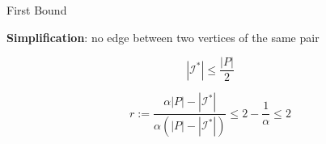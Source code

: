 \begin{frame}{First Bound}

\textbf{Simplification}: no edge between two vertices of the same pair


\pause
\begin{observation}
$$ |\mathcal{I}^*| \leq \frac{|P|}{2} $$
\end{observation}

\pause
\begin{corollary}
$$
r 													:= 
\frac{\alpha |P| - |\mathcal{I}^*|}{\alpha (|P| - |\mathcal{I}^*|)} 	\leq 
2 - \frac{1}{\alpha} 								\leq 
2
$$
\end{corollary}


\end{frame}

